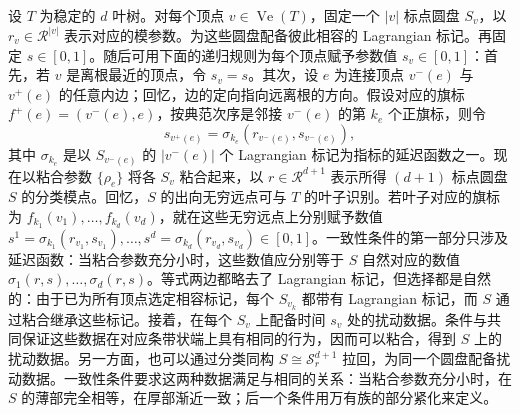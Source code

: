 设 $T$ 为稳定的 $d$ 叶树。对每个顶点 $v\in\operatorname{Ve}(T)$，固定一个 $|v|$ 标点圆盘 $S_v$，以 $r_v\in\mathcal R^{|v|}$ 表示对应的模参数。为这些圆盘配备彼此相容的 Lagrangian 标记。再固定 $s\in[0,1]$。随后可用下面的递归规则为每个顶点赋予参数值 $s_v\in[0,1]$：首先，若 $v$ 是离根最近的顶点，令 $s_v=s$。其次，设 $e$ 为连接顶点 $v^-(e)$ 与 $v^+(e)$ 的任意内边；回忆，边的定向指向远离根的方向。假设对应的旗标 $f^+(e)=(v^-(e),e)$，按典范次序是邻接 $v^-(e)$ 的第 $k_e$ 个正旗标，则令
\begin{equation}\label{eq:10.15}
s_{v^+(e)}=\sigma_{k_e}(r_{v^-(e)},s_{v^-(e)}),
\end{equation}
其中 $\sigma_{k_e}$ 是以 $S_{v^-(e)}$ 的 $|v^-(e)|$ 个 Lagrangian 标记为指标的延迟函数之一。现在以粘合参数 $\{\rho_e\}$ 将各 $S_v$ 粘合起来，以 $r\in\mathcal R^{d+1}$ 表示所得 $(d+1)$ 标点圆盘 $S$ 的分类模点。回忆，$S$ 的出向无穷远点可与 $T$ 的叶子识别。若叶子对应的旗标为 $f_{k_1}(v_1),\ldots,f_{k_d}(v_d)$，就在这些无穷远点上分别赋予数值 $s^1=\sigma_{k_1}(r_{v_1},s_{v_1}),\ldots,s^d=\sigma_{k_d}(r_{v_d},s_{v_d})\in[0,1]$。一致性条件的第一部分只涉及延迟函数：当粘合参数充分小时，这些数值应分别等于 $S$ 自然对应的数值 $\sigma_1(r,s),\ldots,\sigma_d(r,s)$。等式两边都略去了 Lagrangian 标记，但选择都是自然的：由于已为所有顶点选定相容标记，每个 $S_{v_k}$ 都带有 Lagrangian 标记，而 $S$ 通过粘合继承这些标记。接着，在每个 $S_v$ 上配备时间 $s_v$ 处的扰动数据。条件与共同保证这些数据在对应条带状端上具有相同的行为，因而可以粘合，得到 $S$ 上的扰动数据。另一方面，也可以通过分类同构 $S\cong\mathcal S_r^{d+1}$ 拉回，为同一个圆盘配备扰动数据。一致性条件要求这两种数据满足与相同的关系：当粘合参数充分小时，在 $S$ 的薄部完全相等，在厚部渐近一致；后一个条件用万有族的部分紧化来定义。

